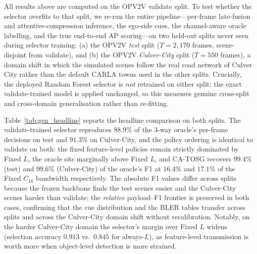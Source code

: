 \documentclass[journal]{IEEEtran}
\newcommand{\method}{CA-TOSG}
\begin{document}
All results above are computed on the OPV2V validate split. To test whether the selector overfits to that split, we re-run the entire pipeline---per-frame late-fusion and attentive-compression inference, the ego-side cues, the channel-aware oracle labelling, and the true end-to-end AP scoring---on two held-out splits never seen during selector training: (a) the OPV2V \emph{test} split ($T=2{,}170$ frames, scene-disjoint from validate), and (b) the OPV2V \emph{Culver-City} split ($T=550$ frames), a domain shift in which the simulated scenes follow the real road network of Culver City rather than the default CARLA towns used in the other splits. Crucially, the deployed Random Forest selector is \emph{not} retrained on either split: the exact validate-trained model is applied unchanged, so this measures genuine cross-split and cross-domain generalisation rather than re-fitting.

Table~\ref{tab:gen_headline} reports the headline comparison on both splits. The validate-trained selector reproduces $88.9\%$ of the $3$-way oracle's per-frame decisions on test and $91.3\%$ on Culver-City, and the policy ordering is identical to validate on both: the fixed feature-level policies remain strictly dominated by Fixed $L$, the oracle sits marginally above Fixed $L$, and \method{} recovers $99.4\%$ (test) and $99.6\%$ (Culver-City) of the oracle's F1 at $16.4\%$ and $17.1\%$ of the Fixed $C_{16}$ bandwidth respectively. The absolute F1 values differ across splits because the frozen backbone finds the test scenes easier and the Culver-City scenes harder than validate; the \emph{relative} payload--F1 frontier is preserved in both cases, confirming that the cue distribution and the BLER tables transfer across splits and across the Culver-City domain shift without recalibration. Notably, on the harder Culver-City domain the selector's margin over Fixed $L$ widens (selection accuracy $0.913$ vs.\ $0.845$ for always-$L$), as feature-level transmission is worth more when object-level detection is more strained.
\end{document}
